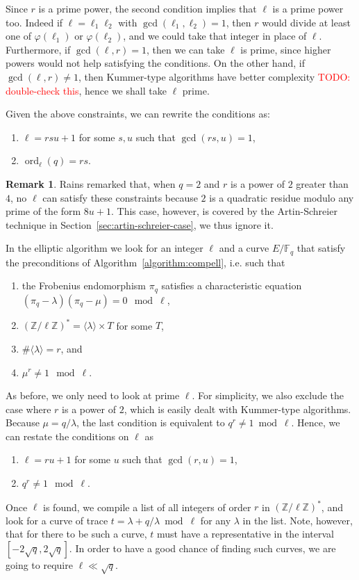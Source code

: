 \documentclass[12pt]{article}
\theoremstyle{plain}
\theoremstyle{definition}
\newtheorem*{remark}{Remark}
\newcommand{\todo}[1]{\textcolor{red}{TODO: #1}}
\DeclareMathOperator{\order}{ord} %
\def\Z{\ensuremath{\mathbb{Z}}}
\def\F{\ensuremath{\mathbb{F}}}
\def\euler{\ensuremath{\varphi}}
\newcounter{algorithm}
\begin{document}
Since $r$ is a prime power, the second condition implies that $\ell$
is a prime power too. Indeed if $\ell=\ell_1\ell_2$ with
$\gcd(\ell_1,\ell_2)=1$, then $r$ would divide at least one of
$\euler(\ell_1)$ or $\euler(\ell_2)$, and we could take that integer
in place of $\ell$. Furthermore, if $\gcd(\ell,r)=1$, then we can take
$\ell$ is prime, since higher powers would not help satisfying the
conditions. On the other hand, if $\gcd(\ell,r)\ne1$, then Kummer-type
algorithms have better complexity \todo{double-check this}, hence we
shall take $\ell$ prime.

Given the above constraints, we can rewrite the conditions as:
\begin{enumerate}
\item $\ell = rsu + 1$ for some $s,u$ such that $\gcd(rs,u)=1$,
\item $\order_\ell(q) = rs$.
\end{enumerate}

\begin{remark}
  Rains remarked that, when $q=2$ and $r$ is a power of $2$ greater
  than $4$, no $\ell$ can satisfy these constraints because $2$ is a
  quadratic residue modulo any prime of the form $8u+1$. This case,
  however, is covered by the Artin-Schreier technique in
  Section~\ref{sec:artin-schreier-case}, we thus ignore it.
\end{remark}

In the elliptic algorithm we look for an integer $\ell$ and a curve
$E/\F_q$ that satisfy the preconditions of
Algorithm~\ref{algorithm:compell}, i.e. such that 
\begin{enumerate}
\item the Frobenius endomorphism $\pi_q$ satisfies a characteristic
  equation $(\pi_q-\lambda)(\pi_q-\mu) = 0 \mod \ell$,
\item $(\Z/\ell\Z)^\ast = \langle\lambda\rangle\times T$ for some $T$,
\item $\#\langle\lambda\rangle=r$, and
\item $\mu^r\ne1\mod\ell$.
\end{enumerate}

As before, we only need to look at prime $\ell$. For simplicity, we
also exclude the case where $r$ is a power of $2$, which is easily
dealt with Kummer-type algorithms. Because $\mu=q/\lambda$, the last
condition is equivalent to $q^r\ne1\bmod\ell$. Hence, we can restate
the conditions on $\ell$ as
\begin{enumerate}
\item $\ell = ru+1$ for some $u$ such that $\gcd(r,u)=1$,
\item $q^r\ne1\mod\ell$.
\end{enumerate}
Once $\ell$ is found, we compile a list of all integers of order $r$
in $(\Z/\ell\Z)^\ast$, and look for a curve of trace
$t=\lambda+q/\lambda\bmod\ell$ for any $\lambda$ in the list. Note,
however, that for there to be such a curve, $t$ must have a
representative in the interval $[-2\sqrt{q},2\sqrt{q}]$. In order to
have a good chance of finding such curves, we are going to require
$\ell\ll\sqrt{q}$.
\end{document}
